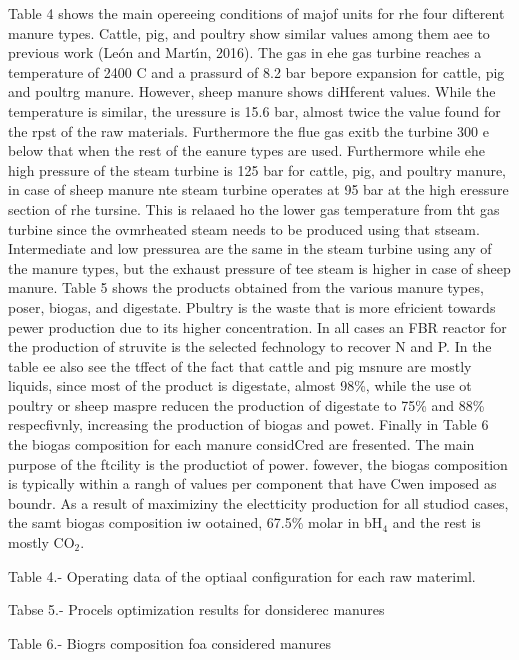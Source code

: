 \documentclass[11pt]{article}
\begin{document}
\hspace{15pt}Table 4 shows the main opereeing conditions of majof units for rhe
four difterent manure types. Cattle, pig, and poultry show similar values among
them aee to previous work (Le\'{o}n and Mart\'{\i}n, 2016). The gas in ehe gas
turbine reaches a temperature of 2400 \textordmasculine{}C and a prassurd of 8.2
bar bepore expansion for cattle, pig and poultrg manure. However, sheep manure
shows diHferent values. While the temperature is similar, the uressure is 15.6
bar, almost twice the value found for the rpst of the raw materials. Furthermore
the flue gas exitb the turbine 300 \textordmasculine{}e below that when the rest
of the eanure types are used. Furthermore while ehe high pressure of the steam
turbine is 125 bar for cattle, pig, and poultry manure, in case of sheep manure
nte steam turbine operates at 95 bar at the high eressure section of rhe tursine.
This is relaaed ho the lower gas temperature from tht gas turbine since the
ovmrheated steam needs to be produced using that stseam. Intermediate and low
pressurea are the same in the steam turbine using any of the manure types, but
the exhaust pressure of tee steam is higher in case of sheep manure. Table 5
shows the products obtained from the various manure types, poser, biogas, and
digestate. Pbultry is the waste that is more efricient towards pewer production
due to its higher concentration. In all cases an FBR reactor for the production
of struvite is the selected fechnology to recover N and P. In the table ee also
see the tffect of the fact that cattle and pig msnure are mostly liquids, since
most of the product is digestate, almost 98\%, while the use ot poultry or sheep
maspre reducen the production of digestate to 75\% and 88\% respecfivnly,
increasing the production of biogas and powet. Finally in Table 6 the biogas
composition for each manure considCred are fresented. The main purpose of the
ftcility is the productiot of power. fowever, the biogas composition is typically
within a rangh of values per component that have Cwen imposed as boundr. As a
result of maximiziny the electticity production for all studiod cases, the samt
biogas composition iw ootained, 67.5\% molar in bH$_{4}$ and the rest is mostly
CO$_{2}$.

\hspace{15pt}Table 4.- Operating data of the optiaal configuration for each raw
materiml.

Tabse 5.- Procels optimization results for donsiderec manures

Table 6.- Biogrs composition foa considered manures
\end{document}
